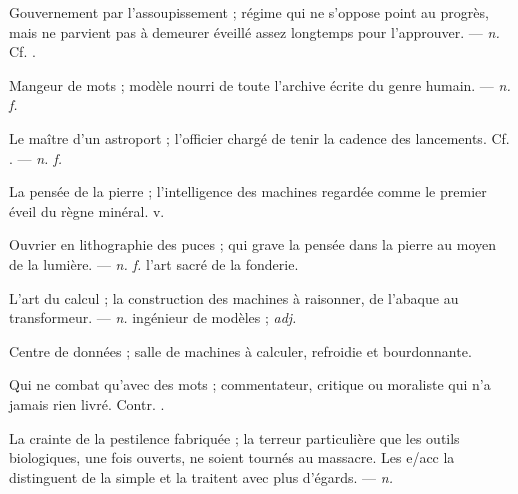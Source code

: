  Gouvernement par l'assoupissement ; régime qui ne s'oppose point au progrès, mais ne parvient pas à demeurer éveillé assez longtemps pour l'approuver. ---  \textit{n.} Cf. .

 Mangeur de mots ; modèle nourri de toute l'archive écrite du genre humain.   ---  \textit{n. f.}

 Le maître d'un astroport ; l'officier chargé de tenir la cadence des lancements. Cf. . ---  \textit{n. f.}

 La pensée de la pierre ; l'intelligence des machines regardée comme le premier éveil du règne minéral.   v.

 Ouvrier en lithographie des puces ; qui grave la pensée dans la pierre au moyen de la lumière. ---  \textit{n. f.} l'art sacré de la fonderie.

 L'art du calcul ; la construction des machines à raisonner, de l'abaque au transformeur. ---  \textit{n.} ingénieur de modèles ;  \textit{adj.}

 Centre de données ; salle de machines à calculer, refroidie et bourdonnante.  

 Qui ne combat qu'avec des mots ; commentateur, critique ou moraliste qui n'a jamais rien livré.  Contr. .

 La crainte de la pestilence fabriquée ; la terreur particulière que les outils biologiques, une fois ouverts, ne soient tournés au massacre. Les e/acc la distinguent de la simple  et la traitent avec plus d'égards. ---  \textit{n.}


